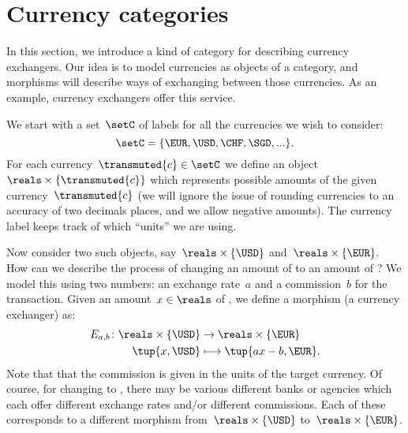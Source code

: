 

\section{Currency categories}
\label{sec:currency_cat}
In this section, we introduce a kind of category for describing currency exchangers. Our idea is to model currencies as objects of a category, and morphisms will describe ways of exchanging between those currencies. As an example, currency exchangers offer this service.

We start with a set~$\setC$ of labels for all the currencies we wish to consider:
\begin{equation*}
    \setC = \{ \EUR, \USD, \CHF, \SGD, ... \}.
\end{equation*}
For each currency~$\transmuted{c} \in \setC$ we define an object~$\reals \times \{\transmuted{c}\}$ which represents possible amounts of the given currency~$\transmuted{c}$ (we will ignore the issue of rounding currencies to an accuracy of two decimals places, and we allow negative amounts). The currency label keeps track of which ``units'' we are using.


Now consider two such objects, say~$\reals \times \{\USD\}$ and~$\reals \times \{\EUR\}$. How can we describe the process of changing an amount of \USD to an amount of \EUR? We model this using two numbers: an exchange rate~$a$ and a commission~$b$ for the transaction. Given an amount~$x \in \reals$ of \USD, we define a morphism (a currency exchanger) as:
\begin{equation*}
    \label{eq:def_curr_ex}
    \begin{aligned}
        E_{a,b} \colon \reals \times \{\USD\} &\rightarrow \reals \times \{\EUR\}\\
        \tup{x, \USD} &\longmapsto \tup{ax - b, \EUR}.
    \end{aligned}
\end{equation*}
Note that that the commission is given in the units of the target currency. Of course, for changing \USD to \EUR, there may be various different banks or agencies which each offer different exchange rates and/or different commissions. Each of these corresponds to a different morphism from~$\reals \times \{\USD\}$ to~$\reals \times \{\EUR\}$.

